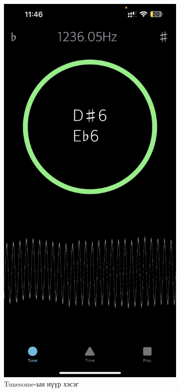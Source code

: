 \clearpage
\clearpage
\begin{figure}[h]
	\centering
	\includegraphics[height=20cm]{images/tunersome2.jpg}
	\caption{Tunesome-ын нүүр хэсэг}
	\label{fig:modalform}
\end{figure}
\clearpage
\clearpage
